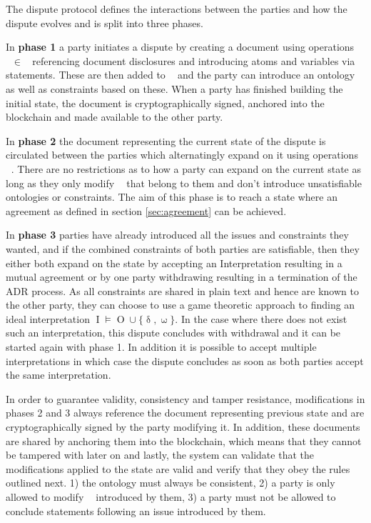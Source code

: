 \documentclass[12pt,msc,a4paper,oneside]{ucl_thesis}
\DeclareMathOperator{\Metalang}{\mathcal{L}_m}
\DeclareMathOperator{\metaop}{\mathcal{o}_m}
\DeclareMathOperator{\Proplang}{\mathcal{L}(N)}
\DeclareMathOperator{\Interpretation}{I}
\DeclareMathOperator{\Ontology}{O}
\DeclareMathOperator{\demand}{\delta}
\DeclareMathOperator{\offer}{\omega}
\begin{document}
The dispute protocol defines the interactions between the parties and how the dispute evolves and is split into three phases.

In \textbf{phase 1} a party initiates a dispute by creating a document using operations $\metaop \in \Metalang$ referencing document disclosures and introducing atoms and variables via statements. These are then added to $\Proplang$ and the party can introduce an ontology as well as constraints based on these. When a party has finished building the initial state, the document is cryptographically signed, anchored into the blockchain and made available to the other party.

In \textbf{phase 2} the document representing the current state of the dispute is circulated between the parties which alternatingly expand on it using operations $\metaop$. There are no restrictions as to how a party can expand on the current state as long as they only modify $\metaop$ that belong to them and don't introduce unsatisfiable ontologies or constraints. The aim of this phase is to reach a state where an agreement as defined in section \ref{sec:agreement} can be achieved.

In \textbf{phase 3} parties have already introduced all the issues and constraints they wanted, and if the combined constraints of both parties are satisfiable, then they either both expand on the state by accepting an Interpretation resulting in a mutual agreement or by one party withdrawing resulting in a termination of the ADR process. As all constraints are shared in plain text and hence are known to the other party, they can choose to use a game theoretic approach to finding an ideal interpretation $\Interpretation \models \Ontology \cup \{\demand, \offer\}$. In the case where there does not exist such an interpretation, this dispute concludes with withdrawal and it can be started again with phase 1. In addition it is possible to accept multiple interpretations in which case the dispute concludes as soon as both parties accept the same interpretation.

In order to guarantee validity, consistency and tamper resistance, modifications in phases 2 and 3 always reference the document representing previous state and are cryptographically signed by the party modifying it. In addition, these documents are shared by anchoring them into the blockchain, which means that they cannot be tampered with later on and lastly, the system can validate that the modifications applied to the state are valid and verify that they obey the rules outlined next. 1) the ontology must always be consistent, 2) a party is only allowed to modify $\metaop$ introduced by them, 3) a party must not be allowed to conclude statements following an issue introduced by them. 
\end{document}
